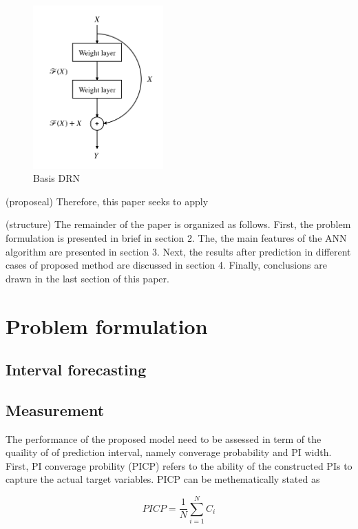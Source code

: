 \documentclass[review]{elsarticle}
\begin{document}
  \begin{figure}[t]
    \caption{Basis DRN}
    \label{Fig:Basic_DRN}
    \includegraphics[width=5cm]{basic_DRN}
  \centering
  \end{figure}


  (proposeal) Therefore, this paper seeks to apply

  (structure) The remainder of the paper is organized as follows. First, the problem formulation is presented in brief in section 2. The, the main features of the ANN algorithm are presented in section 3. Next, the results after prediction in different cases of proposed method  are discussed in section 4. Finally, conclusions are drawn in the last section of this paper.

\section{Problem formulation}

  \subsection{Interval forecasting}

  \subsection{Measurement}
    The performance of the proposed model need to be assessed in term of the quaility of of prediction interval, namely converage probability and PI width. First,  PI converage probility (PICP) refers to the ability of the constructed PIs to capture the actual target variables. PICP can be methematically stated as

    \begin{equation}
      PICP = \frac{1}{N} \sum_{i=1}^{N} C_{i}
      \label{eq.PICP}
    \end{equation}
\end{document}
